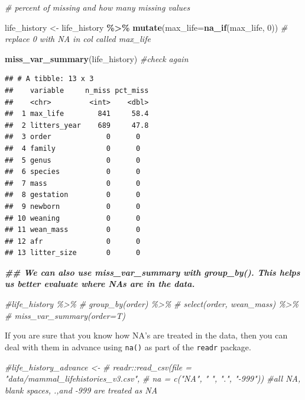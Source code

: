\documentclass[
]{article}
\newenvironment{Shaded}{\begin{snugshade}}{\end{snugshade}}
\newcommand{\AttributeTok}[1]{\textcolor[rgb]{0.13,0.29,0.53}{#1}}
\newcommand{\CommentTok}[1]{\textcolor[rgb]{0.56,0.35,0.01}{\textit{#1}}}
\newcommand{\DecValTok}[1]{\textcolor[rgb]{0.00,0.00,0.81}{#1}}
\newcommand{\DocumentationTok}[1]{\textcolor[rgb]{0.56,0.35,0.01}{\textbf{\textit{#1}}}}
\newcommand{\FunctionTok}[1]{\textcolor[rgb]{0.13,0.29,0.53}{\textbf{#1}}}
\newcommand{\NormalTok}[1]{#1}
\newcommand{\OtherTok}[1]{\textcolor[rgb]{0.56,0.35,0.01}{#1}}
\newcommand{\SpecialCharTok}[1]{\textcolor[rgb]{0.81,0.36,0.00}{\textbf{#1}}}
\begin{document}
\begin{Shaded}
\begin{Highlighting}[]
\CommentTok{\# percent of missing and how many missing values}

\NormalTok{life\_history }\OtherTok{\textless{}{-}} 
\NormalTok{  life\_history }\SpecialCharTok{\%\textgreater{}\%} 
  \FunctionTok{mutate}\NormalTok{(}\AttributeTok{max\_life=}\FunctionTok{na\_if}\NormalTok{(max\_life, }\DecValTok{0}\NormalTok{)) }\CommentTok{\# replace 0 with NA in col called max\_life}

\FunctionTok{miss\_var\_summary}\NormalTok{(life\_history) }\CommentTok{\#check again}
\end{Highlighting}
\end{Shaded}

\begin{verbatim}
## # A tibble: 13 x 3
##    variable     n_miss pct_miss
##    <chr>         <int>    <dbl>
##  1 max_life        841     58.4
##  2 litters_year    689     47.8
##  3 order             0      0  
##  4 family            0      0  
##  5 genus             0      0  
##  6 species           0      0  
##  7 mass              0      0  
##  8 gestation         0      0  
##  9 newborn           0      0  
## 10 weaning           0      0  
## 11 wean_mass         0      0  
## 12 afr               0      0  
## 13 litter_size       0      0
\end{verbatim}

\begin{Shaded}
\begin{Highlighting}[]
\DocumentationTok{\#\# We can also use \textasciigrave{}miss\_var\_summary\textasciigrave{} with \textasciigrave{}group\_by()\textasciigrave{}. This helps us better evaluate where NA\textquotesingle{}s are in the data.}

\CommentTok{\#life\_history \%\textgreater{}\%}
\CommentTok{\#  group\_by(order) \%\textgreater{}\%}
\CommentTok{\#  select(order, wean\_mass) \%\textgreater{}\% }
\CommentTok{\#  miss\_var\_summary(order=T)}
\end{Highlighting}
\end{Shaded}

If you are sure that you know how NA's are treated in the data, then you
can deal with them in advance using \texttt{na()} as part of the
\texttt{readr} package.

\begin{Shaded}
\begin{Highlighting}[]
\CommentTok{\#life\_history\_advance \textless{}{-} }
\CommentTok{\#  readr::read\_csv(file = "data/mammal\_lifehistories\_v3.csv", }
\CommentTok{\#                  na = c("NA", " ", ".", "{-}999")) \#all NA, blank spaces, .,and {-}999 are treated as NA}
\end{Highlighting}
\end{Shaded}
\end{document}
